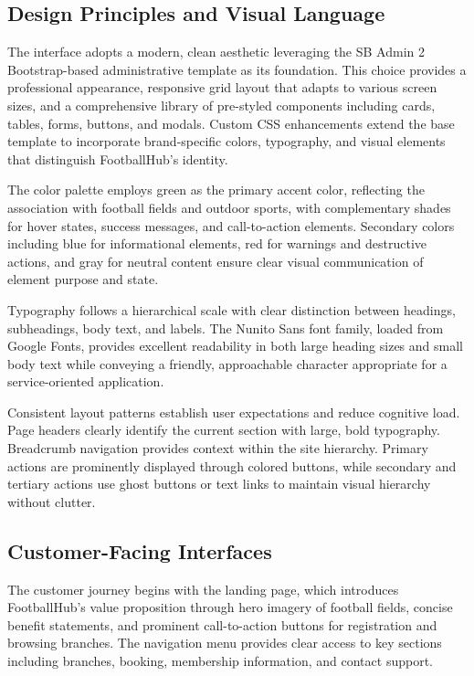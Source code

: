 \subsection{Design Principles and Visual Language}

The interface adopts a modern, clean aesthetic leveraging the SB Admin 2 Bootstrap-based administrative template as its foundation. This choice provides a professional appearance, responsive grid layout that adapts to various screen sizes, and a comprehensive library of pre-styled components including cards, tables, forms, buttons, and modals. Custom CSS enhancements extend the base template to incorporate brand-specific colors, typography, and visual elements that distinguish FootballHub's identity.

The color palette employs green as the primary accent color, reflecting the association with football fields and outdoor sports, with complementary shades for hover states, success messages, and call-to-action elements. Secondary colors including blue for informational elements, red for warnings and destructive actions, and gray for neutral content ensure clear visual communication of element purpose and state.

Typography follows a hierarchical scale with clear distinction between headings, subheadings, body text, and labels. The Nunito Sans font family, loaded from Google Fonts, provides excellent readability in both large heading sizes and small body text while conveying a friendly, approachable character appropriate for a service-oriented application.

Consistent layout patterns establish user expectations and reduce cognitive load. Page headers clearly identify the current section with large, bold typography. Breadcrumb navigation provides context within the site hierarchy. Primary actions are prominently displayed through colored buttons, while secondary and tertiary actions use ghost buttons or text links to maintain visual hierarchy without clutter.

\subsection{Customer-Facing Interfaces}

The customer journey begins with the landing page, which introduces FootballHub's value proposition through hero imagery of football fields, concise benefit statements, and prominent call-to-action buttons for registration and browsing branches. The navigation menu provides clear access to key sections including branches, booking, membership information, and contact support.

